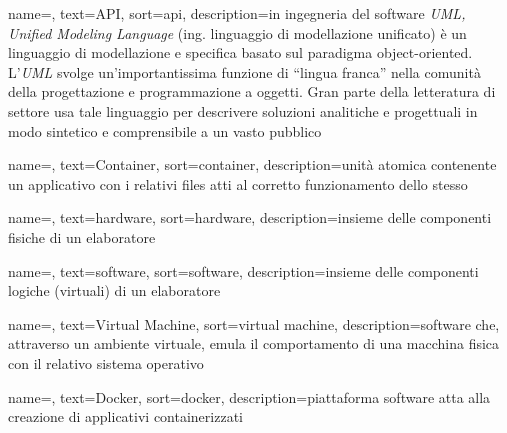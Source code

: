 





{
    name=,
    text=API,
    sort=api, 
    description={in ingegneria del software \emph{UML, Unified Modeling Language} (ing. linguaggio di modellazione unificato) è un linguaggio di modellazione e specifica basato sul paradigma object-oriented. L'\emph{UML} svolge un'importantissima funzione di ``lingua franca'' nella comunità della progettazione e programmazione a oggetti. Gran parte della letteratura di settore usa tale linguaggio per descrivere soluzioni analitiche e progettuali in modo sintetico e comprensibile a un vasto pubblico}
}

{
    name=,
    text=Container,
    sort=container, 
    description={unità atomica contenente un applicativo con i relativi files atti al corretto funzionamento dello stesso}
}

{
    name=,
    text=hardware,
    sort=hardware, 
    description={insieme delle componenti fisiche di un elaboratore}
}

{
    name=,
    text=software,
    sort=software, 
    description={insieme delle componenti logiche (virtuali) di un elaboratore}
}

{
    name=,
    text=Virtual Machine,
    sort=virtual machine, 
    description={software che, attraverso un ambiente virtuale, emula il comportamento di una macchina fisica con il relativo sistema operativo}
}

{
    name=,
    text=Docker,
    sort=docker, 
    description={piattaforma software atta alla creazione di applicativi containerizzati}
}

